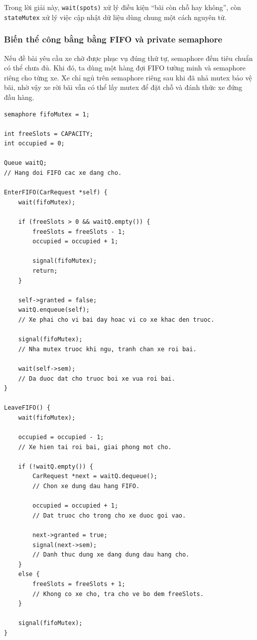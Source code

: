 Trong lời giải này, \texttt{wait(spots)} xử lý điều kiện ``bãi còn chỗ hay
không'', còn \texttt{stateMutex} xử lý việc cập nhật dữ liệu dùng chung
một cách nguyên tử.

\subsubsection*{Biến thể công bằng bằng FIFO và private semaphore}

Nếu đề bài yêu cầu xe chờ được phục vụ đúng thứ tự, semaphore đếm tiêu
chuẩn có thể chưa đủ. Khi đó, ta dùng một hàng đợi FIFO tường minh và
semaphore riêng cho từng xe. Xe chỉ ngủ trên semaphore riêng sau khi đã
nhả mutex bảo vệ bãi, nhờ vậy xe rời bãi vẫn có thể lấy mutex để đặt chỗ
và đánh thức xe đứng đầu hàng.

\begin{lstlisting}
semaphore fifoMutex = 1;

int freeSlots = CAPACITY;
int occupied = 0;

Queue waitQ;
// Hang doi FIFO cac xe dang cho.

EnterFIFO(CarRequest *self) {
    wait(fifoMutex);

    if (freeSlots > 0 && waitQ.empty()) {
        freeSlots = freeSlots - 1;
        occupied = occupied + 1;

        signal(fifoMutex);
        return;
    }

    self->granted = false;
    waitQ.enqueue(self);
    // Xe phai cho vi bai day hoac vi co xe khac den truoc.

    signal(fifoMutex);
    // Nha mutex truoc khi ngu, tranh chan xe roi bai.

    wait(self->sem);
    // Da duoc dat cho truoc boi xe vua roi bai.
}

LeaveFIFO() {
    wait(fifoMutex);

    occupied = occupied - 1;
    // Xe hien tai roi bai, giai phong mot cho.

    if (!waitQ.empty()) {
        CarRequest *next = waitQ.dequeue();
        // Chon xe dung dau hang FIFO.

        occupied = occupied + 1;
        // Dat truoc cho trong cho xe duoc goi vao.

        next->granted = true;
        signal(next->sem);
        // Danh thuc dung xe dang dung dau hang cho.
    }
    else {
        freeSlots = freeSlots + 1;
        // Khong co xe cho, tra cho ve bo dem freeSlots.
    }

    signal(fifoMutex);
}
\end{lstlisting}

